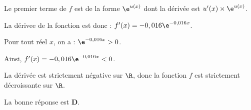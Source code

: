 \medskip

Le premier terme de $f$ est de la forme $\e^{u(x)}$ dont la dérivée est $u'(x)\times\e^{u(x)}$.

La dérivee de la fonction est donc : $f'(x)=-0,016\e^{-0,016x}$.

Pour tout réel $x$, on a : $\e^{-0,016x}>0$.

Ainsi, $f'(x)=-0,016\e^{-0,016x}<0$.

La dérivée est strictement négative sur $\R$, donc la fonction $f$ est strictement décroissante sur $\R$.

La bonne réponse est \textbf{D}.

\bigskip
